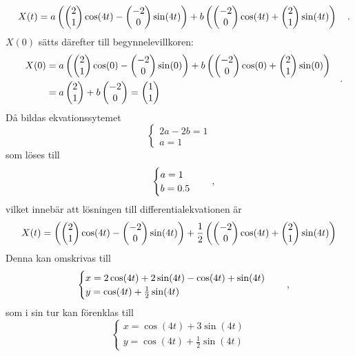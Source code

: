 \begin{equation}
    X(t)=a\left(\begin{pmatrix}2\\1\end{pmatrix}\cos(4t)-\begin{pmatrix}-2\\0\end{pmatrix}\sin(4t)\right)+b\left(\begin{pmatrix}-2\\0\end{pmatrix}\cos(4t)+\begin{pmatrix}2\\1\end{pmatrix}\sin(4t)\right)
\quad\mathrm{.}\!\!\!\!\!\!\end{equation}
\(X(0)\) sätts därefter till begynnelevillkoren:
\begin{equation}
\begin{split}
    X(0)&=a\left(\begin{pmatrix}2\\1\end{pmatrix}\cos(0)-\begin{pmatrix}-2\\0\end{pmatrix}\sin(0)\right)+b\left(\begin{pmatrix}-2\\0\end{pmatrix}\cos(0)+\begin{pmatrix}2\\1\end{pmatrix}\sin(0)\right)\\
    &=a\begin{pmatrix}2\\1\end{pmatrix}+b\begin{pmatrix}-2\\0\end{pmatrix}=\begin{pmatrix}1\\1\end{pmatrix}
\end{split}
\quad\mathrm{.}\!\!\!\!\!\!\end{equation} Då bildas ekvationssytemet
\begin{equation}
    \begin{cases}
        2a-2b=1\\
        a=1
    \end{cases}
\end{equation} som löses till
\begin{equation}
    \begin{cases}
        a=1\\
        b=0.5
    \end{cases}
\quad\mathrm{,}\!\!\!\!\!\!\end{equation} vilket innebär att lösningen till differentialekvationen är
\begin{equation}
    X(t)=\left(\begin{pmatrix}2\\1\end{pmatrix}\cos(4t)-\begin{pmatrix}-2\\0\end{pmatrix}\sin(4t)\right)+\frac{1}{2}\left(\begin{pmatrix}-2\\0\end{pmatrix}\cos(4t)+\begin{pmatrix}2\\1\end{pmatrix}\sin(4t)\right)
\end{equation} Denna kan omskrivas till
\begin{equation}
    \begin{cases}
        x=2\cos(4t)+2\sin(4t)-\cos(4t)+\sin(4t)\\
        y=\cos(4t)+\frac{1}{2}\sin(4t)
    \end{cases}
\quad\mathrm{,}\!\!\!\!\!\!\end{equation} som i sin tur kan förenklas till
\begin{equation}
    \begin{cases}
        x=\cos(4t)+3\sin(4t)\\
        y=\cos(4t)+\frac{1}{2}\sin(4t)
    \end{cases}
\end{equation}

